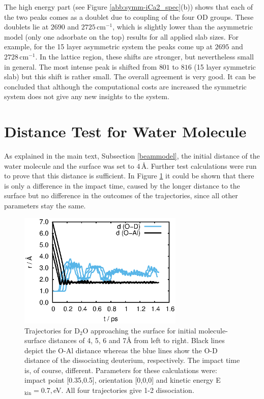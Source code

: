 \documentclass[11pt,DIV=13,BCOR=5mm,a4paper,headinclude]{scrbook}
\begin{document}
The high energy part (see Figure \ref{abb:symm-iCa2_spec}(b)) shows that each of the two peaks comes as a doublet due to coupling of the four OD groups. %
These doublets lie at $2690$ and $2725\,$cm$^{-1}$, which is slightly lower than the asymmetric model (only one adsorbate on the top) results for all applied slab sizes.
For example, for the 15 layer asymmetric system the peaks come up at $2695$ and $2728\,$cm$^{-1}$.
In the lattice region, these shifts are stronger, but nevertheless small in general.
The most intense peak is shifted from $801$ to $816$ (15 layer symmetric slab) but this shift is rather small.
The overall agreement is very good.
It can be concluded that although the computational costs are increased the symmetric system does not give any new insights to the system.
\\
\def\thefigure{C.\arabic{figure}}
\def\thetable{C.\arabic{table}}
\section{Distance Test for Water Molecule}\label{sec:disttest}
As explained in the main text, Subsection \ref{beammodel}, the initial distance of the water molecule and the surface was set to $4\,$\AA{}.
Further test calculations were run to prove that this distance is sufficient.
In Figure \ref{abb:MBS-dist} it could be shown that there is only a difference in the impact time, caused by the longer distance to the surface but no difference in the outcomes of the trajectories, since all other parameters stay the same.
 \begin{figure}[!h]
    \centering
    \includegraphics[width=0.7\textwidth]{figures/11-20/MD_all.eps}
  \caption{Trajectories for D$_2$O approaching the surface for initial molecule-surface distances of 4, 5, 6 and 7\AA{} from left to right.
Black lines depict the O-Al distance whereas the blue lines show the O-D distance of the dissociating deuterium, respectively.
The impact time is, of course, different.
Parameters for these calculations were: impact point [0.35,0.5], orientation [0,0,0] and kinetic energy E$_\textrm{kin}=0.7,$eV.
All four trajectories give 1-2 dissociation.}
  \label{abb:MBS-dist}
 \end{figure}
\\
\def\thefigure{D.\arabic{figure}}
\def\thetable{D.\arabic{table}}
\end{document}
